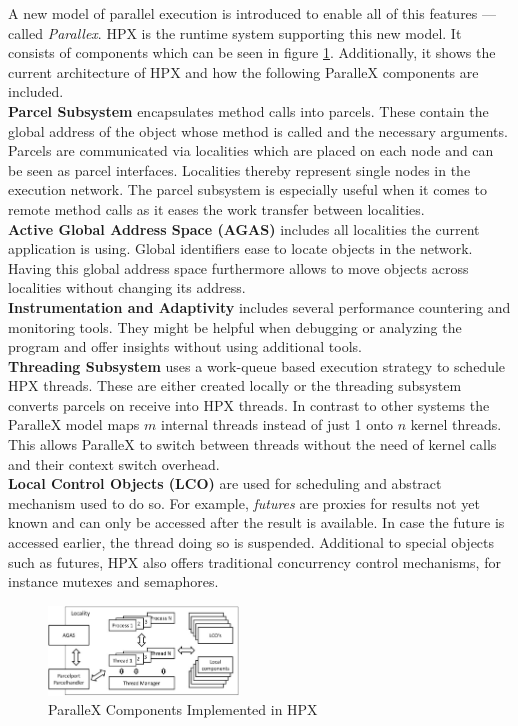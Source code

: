   
  A new model of parallel execution is introduced to enable all of this features --- called \textit{Parallex}.
  HPX is the runtime system supporting this new model.
  It consists of components which can be seen in figure \ref{fig:HPXcomp}.
  Additionally, it shows the current architecture of HPX and how the following ParalleX components are included.~\cite{Kaiser.2009}\\
  \textbf{Parcel Subsystem} encapsulates method calls into parcels.
  These contain the global address of the object whose method is called and the necessary arguments.
  Parcels are communicated via localities which are placed on each node and can be seen as parcel interfaces.
  Localities thereby represent single nodes in the execution network.
  The parcel subsystem is especially useful when it comes to remote method calls as it eases the work transfer between localities.\\
  \textbf{Active Global Address Space (AGAS)} includes all localities the current application is using.
  Global identifiers ease to locate objects in the network.
  Having this global address space furthermore allows to move objects across localities without changing its address.\\  
  \textbf{Instrumentation and Adaptivity} includes several performance countering and monitoring tools.
  They might be helpful when debugging or analyzing the program and offer insights without using additional tools.\\
  \textbf{Threading Subsystem} uses a work-queue based execution strategy to schedule HPX threads.
  These are either created locally or the threading subsystem converts parcels on receive into HPX threads.
  In contrast to other systems the ParalleX model maps \(m\) internal threads instead of just 1 onto \(n\) kernel threads.
  This allows ParalleX to switch between threads without the need of kernel calls and their context switch overhead.\\  
  \textbf{Local Control Objects (LCO)} are used for scheduling and abstract mechanism used to do so.
  For example, \textit{futures} are proxies for results not yet known and can only be accessed after the result is available.
  In case the future is accessed earlier, the thread doing so is suspended.
  Additional to special objects such as futures, HPX also offers traditional concurrency control mechanisms, for instance mutexes and semaphores.
\begin{figure}[htbp]
	\centering
	\includegraphics[width=0.45\textwidth]{figures/parallexArchitecture.JPG}
	\caption{ParalleX Components Implemented in HPX~\cite{Kaiser.2009}}
	\label{fig:HPXcomp}
\end{figure}
  	
